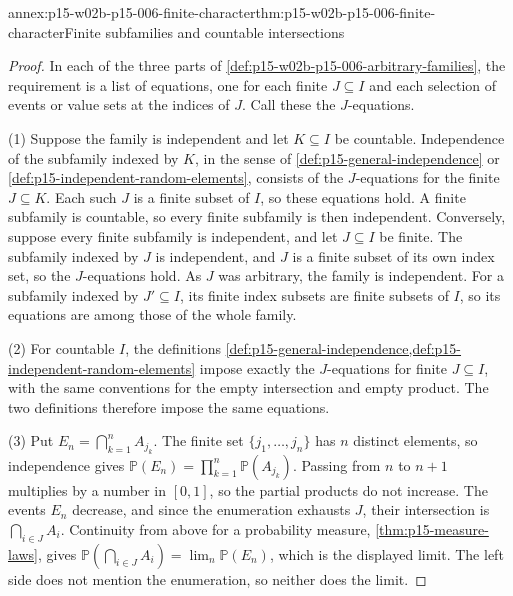 \begin{annexitem}{annex:p15-w02b-p15-006-finite-character}{thm:p15-w02b-p15-006-finite-character}{Finite subfamilies and countable intersections}
\begin{proof}
In each of the three parts of
\cref{def:p15-w02b-p15-006-arbitrary-families}, the requirement is a
list of equations, one for each finite \(J\subseteq I\) and each
selection of events or value sets at the indices of \(J\). Call these
the \(J\)-equations.

(1) Suppose the family is independent and let \(K\subseteq I\) be
countable. Independence of the subfamily indexed by \(K\), in the sense
of \cref{def:p15-general-independence} or
\cref{def:p15-independent-random-elements}, consists of the
\(J\)-equations for the finite \(J\subseteq K\). Each such \(J\) is a
finite subset of \(I\), so these equations hold. A finite subfamily is
countable, so every finite subfamily is then independent. Conversely,
suppose every finite subfamily is independent, and let \(J\subseteq I\)
be finite. The subfamily indexed by \(J\) is independent, and \(J\) is a
finite subset of its own index set, so the \(J\)-equations hold. As
\(J\) was arbitrary, the family is independent. For a subfamily indexed
by \(J'\subseteq I\), its finite index subsets are finite subsets of
\(I\), so its equations are among those of the whole family.

(2) For countable \(I\), the definitions
\cref{def:p15-general-independence,def:p15-independent-random-elements}
impose exactly the \(J\)-equations for finite \(J\subseteq I\), with the
same conventions for the empty intersection and empty product. The two
definitions therefore impose the same equations.

(3) Put \(E_n=\bigcap_{k=1}^nA_{j_k}\). The finite set
\(\{j_1,\ldots,j_n\}\) has \(n\) distinct elements, so independence gives
\(\mathbb P(E_n)=\prod_{k=1}^n\mathbb P(A_{j_k})\). Passing from \(n\)
to \(n+1\) multiplies by a number in \([0,1]\), so the partial products
do not increase. The events \(E_n\) decrease, and since the enumeration
exhausts \(J\), their intersection is \(\bigcap_{i\in J}A_i\).
Continuity from above for a probability measure,
\cref{thm:p15-measure-laws}, gives
\(\mathbb P(\bigcap_{i\in J}A_i)=\lim_n\mathbb P(E_n)\), which is the
displayed limit. The left side does not mention the enumeration, so
neither does the limit.
\end{proof}
\end{annexitem}

